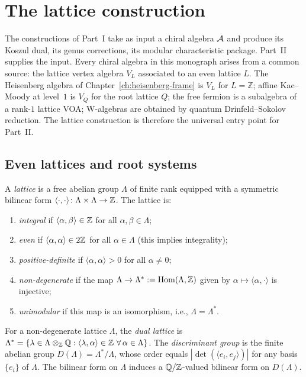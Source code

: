 
\chapter{The lattice construction}
\label{ch:lattice}


The constructions of Part~I take as input a chiral algebra $\mathcal{A}$
and produce its Koszul dual, its genus corrections, its modular
characteristic package.  Part~II supplies the input.  Every chiral
algebra in this monograph arises from a common source: the lattice
vertex algebra $V_L$ associated to an even lattice $L$.  The
Heisenberg algebra of Chapter~\ref{ch:heisenberg-frame} is $V_L$ for $L = \mathbb{Z}$; affine
Kac--Moody at level~$1$ is $V_{Q}$ for the root lattice $Q$;
the free fermion is a subalgebra of a rank-$1$ lattice VOA;
W-algebras are obtained by quantum Drinfeld--Sokolov reduction.
The lattice construction is therefore the universal entry point
for Part~II.

\section{Even lattices and root systems}%
\label{sec:lattice:lattices}%

\begin{definition}[Lattice]\label{def:lattice:lattice}
A \emph{lattice} is a free abelian group $\Lambda$ of finite rank
equipped with a symmetric bilinear form
$\langle \cdot, \cdot \rangle \colon \Lambda \times \Lambda \to \mathbb{Z}$.
The lattice is:
\begin{enumerate}[label=(\roman*)]
\item \emph{integral} if $\langle \alpha, \beta \rangle \in \mathbb{Z}$ for all
  $\alpha, \beta \in \Lambda$;
\item \emph{even} if $\langle \alpha, \alpha \rangle \in 2\mathbb{Z}$ for all
  $\alpha \in \Lambda$ (this implies integrality);
\item \emph{positive-definite} if $\langle \alpha, \alpha \rangle > 0$
  for all $\alpha \neq 0$;
\item \emph{non-degenerate} if the map
  $\Lambda \to \Lambda^* := \operatorname{Hom}(\Lambda, \mathbb{Z})$ given by
  $\alpha \mapsto \langle \alpha, \cdot \rangle$ is injective;
\item \emph{unimodular} if this map is an isomorphism, i.e.,
  $\Lambda = \Lambda^*$.
\end{enumerate}
\end{definition}

\begin{definition}\label{def:lattice:discriminant}
For a non-degenerate lattice $\Lambda$, the \emph{dual lattice} is
$\Lambda^* = \{\lambda \in \Lambda \otimes_{\mathbb{Z}} \mathbb{Q} :
\langle \lambda, \alpha \rangle \in \mathbb{Z} \ \forall\, \alpha \in \Lambda\}$.
The \emph{discriminant group} is the finite abelian group
$D(\Lambda) = \Lambda^*/\Lambda$,
whose order equals $|\det(\langle e_i, e_j \rangle)|$ for any basis
$\{e_i\}$ of $\Lambda$. The bilinear form on $\Lambda$ induces a
$\mathbb{Q}/\mathbb{Z}$-valued bilinear form on $D(\Lambda)$.
\end{definition}

